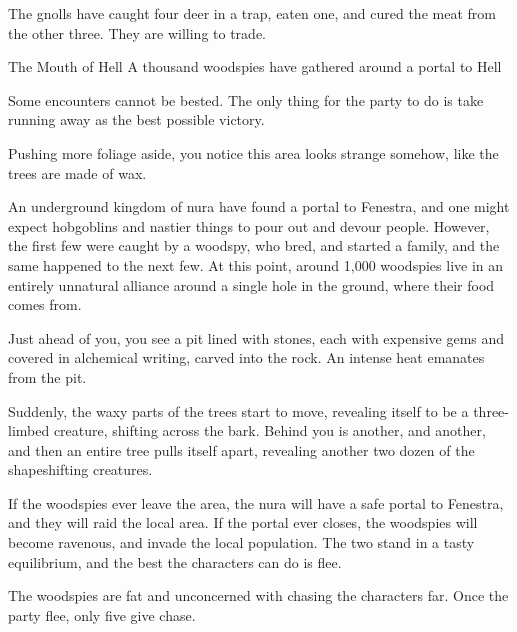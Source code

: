 \begin{multicols}{2}
\begin{boxtext}
\end{boxtext}

The gnolls have caught four deer in a trap, eaten one, and cured the meat from the other three.  They are willing to trade.


{\N The Mouth of Hell}%
{A thousand woodspies have gathered around a portal to Hell}%

Some encounters cannot be bested. The only thing for the party to do is take running away as the best possible victory.

\begin{boxtext}

	Pushing more foliage aside, you notice this area looks strange somehow, like the trees are made of wax.

\end{boxtext}

An underground kingdom of nura have found a portal to Fenestra, and one might expect hobgoblins and nastier things to pour out and devour people.
However, the first few were caught by a woodspy, who bred, and started a family, and the same happened to the next few.
At this point, around 1,000 woodspies live in an entirely unnatural alliance around a single hole in the ground, where their food comes from.

\begin{boxtext}

	Just ahead of you, you see a pit lined with stones, each with expensive gems and covered in alchemical writing, carved into the rock.
	An intense heat emanates from the pit.

	Suddenly, the waxy parts of the trees start to move, revealing itself to be a three-limbed creature, shifting across the bark.  Behind you is another, and another, and then an entire tree pulls itself apart, revealing another two dozen of the shapeshifting creatures.

\end{boxtext}

If the woodspies ever leave the area, the nura will have a safe portal to Fenestra, and they will raid the local area.
If the portal ever closes, the woodspies will become ravenous, and invade the local population.
The two stand in a tasty equilibrium, and the best the characters can do is flee.

The woodspies are fat and unconcerned with chasing the characters far.  Once the party flee, only five give chase.


\end{multicols}
